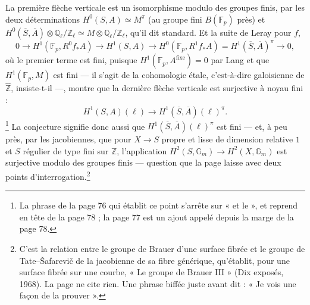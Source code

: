 \documentclass[11pt,a4paper]{article}
\begin{document}

La première flèche verticale est un isomorphisme modulo des groupes finis,
par les deux déterminations $H^{0}(S, A) \simeq M^{\pi}$ (au groupe fini
$B(\mathbb{F}_{p})$ près) et $H^{0}(\overline{S}, \overline{A}) \otimes
\mathbb{Q}_{\ell}/\mathbb{Z}_{\ell} \simeq M \otimes \mathbb{Q}_{\ell}/\mathbb{Z}_{\ell}$,
qu'il dit standard. Et la suite de Leray pour $f$,
\[
0 \to H^{1}(\mathbb{F}_{p}, R^{0}f_{*}A) \to H^{1}(S, A) \to
H^{0}(\mathbb{F}_{p}, R^{1}f_{*}A) = H^{1}(\overline{S}, \overline{A})^{\pi} \to 0 ,
\]
où le premier terme est fini, puisque $H^{1}(\mathbb{F}_{p}, A^{\mathrm{fixe}}) = 0$
par Lang et que $H^{1}(\mathbb{F}_{p}, M)$ est fini --- il s'agit de la
cohomologie étale, c'est-à-dire galoisienne de $\hat{\mathbb{Z}}$, insiste-t-il
---, montre que la dernière flèche verticale est surjective à noyau fini :
\[
H^{1}(S, A)(\ell) \longrightarrow H^{1}(\overline{S}, \overline{A})(\ell)^{\pi} .
\]\footnote{La phrase de la page 76 qui établit ce point s'arrête sur « et le »,
et reprend en tête de la page 78 ; la page 77 est un ajout appelé depuis la marge
de la page 78.} La conjecture signifie donc aussi que $H^{1}(\overline{S},
\overline{A})(\ell)^{\pi}$ est fini --- et, à peu près, par les jacobiennes, que
pour $X \to S$ propre et lisse de dimension relative $1$ et $S$ régulier de type
fini sur $\mathbb{Z}$, l'application $H^{2}(S, \mathbb{G}_{m}) \to H^{2}(X,
\mathbb{G}_{m})$ est surjective modulo des groupes finis --- question que la page
laisse avec deux points d'interrogation.\footnote{C'est la relation entre le
groupe de Brauer d'une surface fibrée et le groupe de Tate--Šafarevič de la
jacobienne de sa fibre générique, qu'établit, pour une surface fibrée sur une
courbe, « Le groupe de Brauer III » (Dix exposés, 1968). La page ne cite rien. Une
phrase biffée juste avant dit : « Je vois une façon de la prouver ».}
\end{document}
